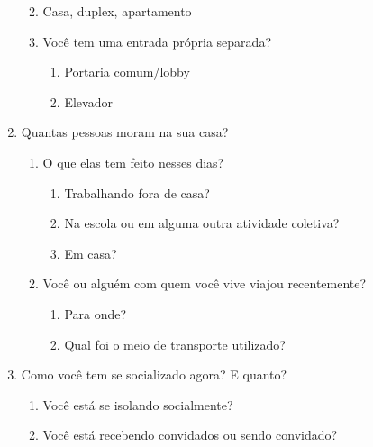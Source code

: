 \documentclass[onecolumn,journal]{IEEEtran}
\begin{document}
\begin{multicols}{2}
\begin{enumerate}
  \begin{enumerate}
  \def\labelenumii{\alph{enumii}.}
  \tightlist
  \item Casa, duplex, apartamento
  \item Você tem uma entrada própria separada?

    \begin{enumerate}
    \def\labelenumiii{\roman{enumiii}.}
    \tightlist
    \item Portaria comum/lobby
    \item Elevador
    \end{enumerate}
    
  \end{enumerate}
  
\item Quantas pessoas moram na sua casa?

  \begin{enumerate}
  \def\labelenumii{\alph{enumii}.}
  \tightlist
  \item O que elas tem feito nesses dias?

    \begin{enumerate}
    \def\labelenumiii{\roman{enumiii}.}
    \tightlist
    \item Trabalhando fora de casa?
    \item Na escola ou em alguma outra atividade coletiva?
    \item Em casa?
    \end{enumerate}
    
    
  \item Você ou alguém com quem você vive viajou recentemente?

    \begin{enumerate}
    \def\labelenumiii{\roman{enumiii}.}
    \tightlist
    \item Para onde?
    \item Qual foi o meio de transporte utilizado?
    \end{enumerate}
    
  \end{enumerate}
  
\item Como você tem se socializado agora? E quanto?

  \begin{enumerate}
  \def\labelenumii{\alph{enumii}.}
  \tightlist
  \item Você está se isolando socialmente?
  \item Você está recebendo convidados ou sendo convidado?
  \end{enumerate}
  

\end{enumerate}
\end{multicols}
\end{document}
